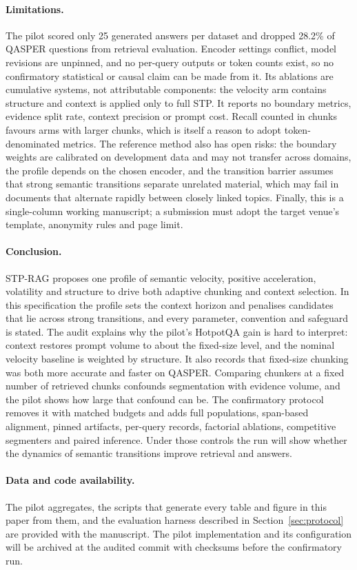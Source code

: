 \documentclass[10pt,a4paper]{article}
\begin{document}
\paragraph{Limitations.} The pilot scored only 25 generated answers per dataset and dropped 28.2\% of QASPER questions from retrieval evaluation. Encoder settings conflict, model revisions are unpinned, and no per-query outputs or token counts exist, so no confirmatory statistical or causal claim can be made from it. Its ablations are cumulative systems, not attributable components: the velocity arm contains structure and context is applied only to full STP. It reports no boundary metrics, evidence split rate, context precision or prompt cost. Recall counted in chunks favours arms with larger chunks, which is itself a reason to adopt token-denominated metrics. The reference method also has open risks: the boundary weights are calibrated on development data and may not transfer across domains, the profile depends on the chosen encoder, and the transition barrier assumes that strong semantic transitions separate unrelated material, which may fail in documents that alternate rapidly between closely linked topics. Finally, this is a single-column working manuscript; a submission must adopt the target venue's template, anonymity rules and page limit.

\paragraph{Conclusion.} STP-RAG proposes one profile of semantic velocity, positive acceleration, volatility and structure to drive both adaptive chunking and context selection. In this specification the profile sets the context horizon and penalises candidates that lie across strong transitions, and every parameter, convention and safeguard is stated. The audit explains why the pilot's HotpotQA gain is hard to interpret: context restores prompt volume to about the fixed-size level, and the nominal velocity baseline is weighted by structure. It also records that fixed-size chunking was both more accurate and faster on QASPER. Comparing chunkers at a fixed number of retrieved chunks confounds segmentation with evidence volume, and the pilot shows how large that confound can be. The confirmatory protocol removes it with matched budgets and adds full populations, span-based alignment, pinned artifacts, per-query records, factorial ablations, competitive segmenters and paired inference. Under those controls the run will show whether the dynamics of semantic transitions improve retrieval and answers.

\paragraph{Data and code availability.} The pilot aggregates, the scripts that generate every table and figure in this paper from them, and the evaluation harness described in Section~\ref{sec:protocol} are provided with the manuscript. The pilot implementation and its configuration will be archived at the audited commit with checksums before the confirmatory run.

\printbibliography
\end{document}
